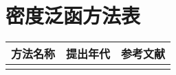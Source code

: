 
\chapter{密度泛函方法表}

\begingroup
\setlength{\LTleft}{-20cm plus -1fill}
\setlength{\LTright}{\LTleft}

\begin{longtable}{lll}
    \hline
    方法名称 & 提出年代 & 参考文献 \\ \hline
    \endhead
    \hline
    \endfoot
\end{longtable}

\endgroup
